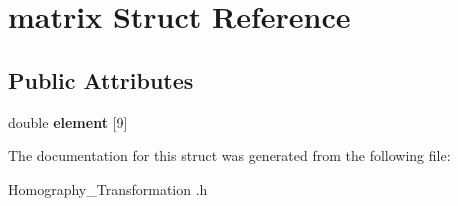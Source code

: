 \hypertarget{structmatrix}{\section{matrix Struct Reference}
\label{structmatrix}
}
\subsection*{Public Attributes}
\begin{DoxyCompactItemize}
\item 
\hypertarget{structmatrix_a2a5a31da86d64956573d665d7c484597}{double {\bfseries element} \mbox{[}9\mbox{]}}\label{structmatrix_a2a5a31da86d64956573d665d7c484597}

\end{DoxyCompactItemize}


The documentation for this struct was generated from the following file\-:\begin{DoxyCompactItemize}
\item 
Homography\-\_\-\-Transformation .\-h\end{DoxyCompactItemize}
